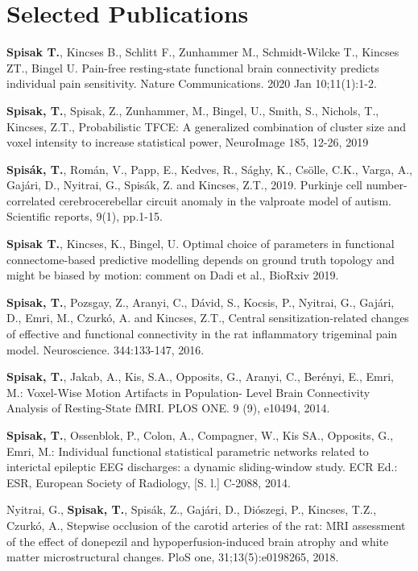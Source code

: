 \documentclass[12pt,a4paper,roman]{moderncv}        %
\begin{document}
\section{Selected Publications}
\textbf{Spisak T.}, Kincses B., Schlitt F., Zunhammer M., Schmidt-Wilcke T., Kincses ZT., Bingel U. Pain-free resting-state functional brain connectivity predicts individual pain sensitivity. Nature Communications. 2020 Jan 10;11(1):1-2.

\textbf{Spisak, T.}, Spisak, Z., Zunhammer, M., Bingel, U., Smith, S., Nichols, T., Kincses, Z.T., Probabilistic TFCE: A generalized combination of cluster size and voxel intensity to increase statistical power, NeuroImage 185, 12-26, 2019

\textbf{Spisák, T.}, Román, V., Papp, E., Kedves, R., Sághy, K., Csölle, C.K., Varga, A., Gajári, D., Nyitrai, G., Spisák, Z. and Kincses, Z.T., 2019. Purkinje cell number-correlated cerebrocerebellar circuit anomaly in the valproate model of autism. Scientific reports, 9(1), pp.1-15.

\textbf{Spisak T.}, Kincses, K., Bingel, U. Optimal choice of parameters in functional connectome-based predictive modelling depends on ground truth topology and might be biased by motion: comment on Dadi et al., BioRxiv 2019.

\textbf{Spisak, T.}, Pozsgay, Z., Aranyi, C., Dávid, S., Kocsis, P., Nyitrai, G., Gajári, D., Emri, M., Czurkó, A. and Kincses, Z.T., Central sensitization-related changes of effective and functional connectivity in the rat inflammatory trigeminal pain model. Neuroscience. 344:133-147, 2016.

\textbf{Spisak, T.}, Jakab, A., Kis, S.A., Opposits, G., Aranyi, C., Berényi, E., Emri, M.: Voxel-Wise Motion Artifacts in Population- Level Brain Connectivity Analysis of Resting-State fMRI. PLOS ONE. 9 (9), e10494, 2014.

\textbf{Spisak, T.}, Ossenblok, P., Colon, A., Compagner, W., Kis SA., Opposits, G., Emri, M.: Individual functional statistical parametric networks related to interictal epileptic EEG discharges: a dynamic sliding-window study. ECR Ed.: ESR, European Society of Radiology, [S. l.] C-2088, 2014.

Nyitrai, G., \textbf{Spisak, T.}, Spisák, Z., Gajári, D., Diószegi, P., Kincses, T.Z., Czurkó, A., Stepwise occlusion of the carotid arteries of the rat: MRI assessment of the effect of donepezil and hypoperfusion-induced brain atrophy and white matter microstructural changes. PloS one, 31;13(5):e0198265, 2018.
\end{document}
